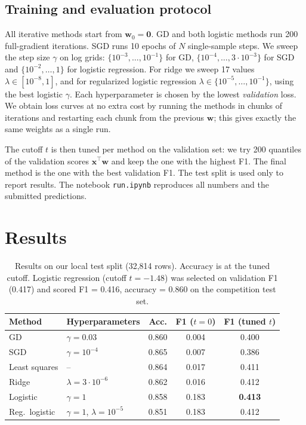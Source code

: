 \documentclass[10pt,conference,compsocconf]{IEEEtran}
\begin{document}
\subsection{Training and evaluation protocol}
All iterative methods start from $\mathbf{w}_0 = \mathbf{0}$. GD and both logistic
methods run 200 full-gradient iterations. SGD runs 10 epochs of $N$ single-sample
steps. We sweep the step size $\gamma$ on log grids: $\{10^{-3}, \dots, 10^{-1}\}$ for
GD, $\{10^{-4}, \dots, 3\cdot10^{-3}\}$ for SGD and $\{10^{-2}, \dots, 1\}$ for
logistic regression. For ridge we sweep 17 values $\lambda \in [10^{-8}, 1]$, and for
regularized logistic regression $\lambda \in \{10^{-5}, \dots, 10^{-1}\}$, using the
best logistic $\gamma$. Each hyperparameter is chosen by the lowest
\emph{validation} loss. We obtain loss curves at no extra cost by running the
methods in chunks of iterations and restarting each chunk from the previous
$\mathbf{w}$; this gives exactly the same weights as a single run.

The cutoff $t$ is then tuned per method on the validation set: we try 200
quantiles of the validation scores $\mathbf{x}^\top \mathbf{w}$ and keep the one
with the highest F1. The final method is the one with the best validation F1. The
test split is used only to report results. The notebook \texttt{run.ipynb}
reproduces all numbers and the submitted predictions.

\section{Results}

\begin{table}[tbp]
  \centering
  \small
  \setlength{\tabcolsep}{3pt}
  \begin{tabular}{@{}llccc@{}}
    \toprule
    Method & Hyperparameters & Acc. & F1 ($t=0$) & F1 (tuned $t$) \\
    \midrule
    GD            & $\gamma = 0.03$                 & 0.860 & 0.004 & 0.400 \\
    SGD           & $\gamma = 10^{-4}$              & 0.865 & 0.007 & 0.386 \\
    Least squares & --                              & 0.864 & 0.017 & 0.411 \\
    Ridge         & $\lambda = 3\cdot10^{-6}$       & 0.862 & 0.016 & 0.412 \\
    Logistic      & $\gamma = 1$                    & 0.858 & 0.183 & \textbf{0.413} \\
    Reg.\ logistic & $\gamma = 1$, $\lambda = 10^{-5}$ & 0.851 & 0.183 & 0.412 \\
    \bottomrule
  \end{tabular}
  \caption{Results on our local test split (32,814 rows). Accuracy is at the
    tuned cutoff. Logistic regression (cutoff $t = -1.48$) was selected on
    validation F1 (0.417) and scored F1 = 0.416, accuracy = 0.860 on the
    competition test set.}
  \vspace{-3mm}
  \label{tab:results}
\end{table}
\end{document}

